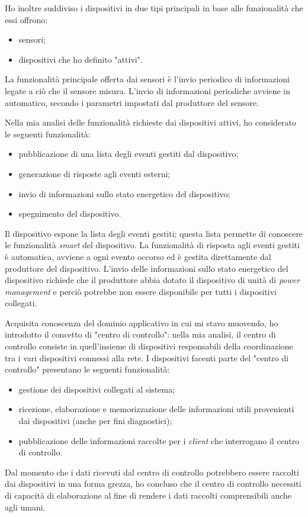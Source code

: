 Ho inoltre suddiviso i dispositivi in due tipi principali in base alle funzionalità che essi offrono:
\begin{itemize}
	\item sensori;
	\item dispositivi che ho definito "attivi".
\end{itemize}
La funzionalità principale offerta dai sensori è l'invio periodico di informazioni legate a ciò che il sensore misura.
L'invio di informazioni periodiche avviene in automatico, secondo i parametri impostati dal produttore del sensore.

Nella mia analisi delle funzionalità richieste dai dispositivi attivi, ho considerato le seguenti funzionalità:
\begin{itemize}
	\item pubblicazione di una lista degli eventi gestiti dal dispositivo;
	\item generazione di risposte agli eventi esterni;
	\item invio di informazioni sullo stato energetico del dispositivo;
	\item spegnimento del dispositivo.
\end{itemize}

Il dispositivo espone la lista degli eventi gestiti; questa lista permette di conoscere le funzionalità \emph{smart} del dispositivo.
La funzionalità di risposta agli eventi gestiti è automatica, avviene a ogni evento occorso ed è gestita direttamente dal produttore del dispositivo.
L'invio delle informazioni sullo stato energetico del dispositivo richiede che il produttore abbia dotato il dispositivo di unità di \emph{power management} e perciò potrebbe non essere disponibile per tutti i dispositivi collegati.

Acquisita conoscenza del dominio applicativo in cui mi stavo muovendo, ho introdotto il concetto di "centro di controllo": nella mia analisi, il centro di controllo consiste in quell'insieme di dispositivi responsabili della coordinazione tra i vari dispositivi connessi alla rete.
I dispositivi facenti parte del "centro di controllo" presentano le seguenti funzionalità:
\begin{itemize}
	\item gestione dei dispositivi collegati al sistema;
	\item ricezione, elaborazione e memorizzazione delle informazioni utili provenienti dai dispositivi (anche per fini diagnostici);
	\item pubblicazione delle informazioni raccolte per i \emph{client} che interrogano il centro di controllo.
\end{itemize}
Dal momento che i dati ricevuti dal centro di controllo potrebbero essere raccolti dai dispositivi in una forma grezza, ho concluso che il centro di controllo necessiti di capacità di elaborazione al fine di rendere i dati raccolti comprensibili anche agli umani.

